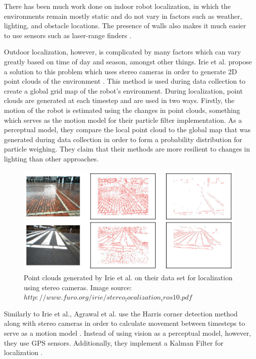 \documentclass[letterpaper, 12 pt, conference]{ieeeconf}  %
\begin{document}
There has been much work done on indoor robot localization, in which the environments remain mostly static and do not vary in factors such as weather, lighting, and obstacle locations. The presence of walls also makes it much easier to use sensors such as laser-range finders \cite{laser_range}. 
\par
Outdoor localization, however, is complicated by many factors which can vary greatly based on time of day and season, amongst other things. Irie et al. propose a solution to this problem which uses stereo cameras in order to generate 2D point clouds of the environment \cite{irie2010mobile}. This method is used during data collection to create a global grid map of the robot's environment. During localization, point clouds are generated at each timestep and are used in two ways. Firstly, the motion of the robot is estimated using the changes in point clouds, something which serves as the motion model for their particle filter implementation. As a perceptual model, they compare the local point cloud to the global map that was generated during data collection in order to form a probability distribution for particle weighing. They claim that their methods are more resilient to changes in lighting than other approaches.
\begin{figure}[h]
\centering
\includegraphics[scale=0.5]{point_clouds}
\caption{Point clouds generated by Irie et al. on their data set for localization using stereo cameras. Image source: $http://www.furo.org/irie/stereo_localization_iros10.pdf$}
\end{figure}

\par
Similarly to Irie et al., Agrawal et al. use the Harris corner detection method \cite{Harris} along with stereo cameras in order to calculate movement between timesteps to serve as a motion model \cite{agrawal2006real}. Instead of using vision as a perceptual model, however, they use GPS sensors. Additionally, they implement a Kalman Filter for localization \cite{Kalman}.
\end{document}
